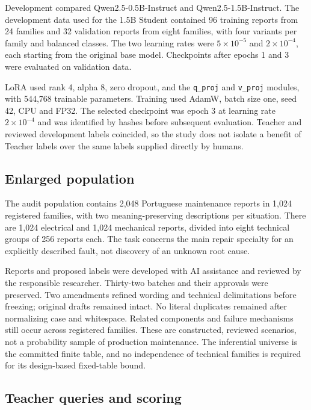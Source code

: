 \documentclass[
  10pt,
]{article}
\begin{document}
Development compared Qwen2.5-0.5B-Instruct and Qwen2.5-1.5B-Instruct.
The development data used for the 1.5B Student contained 96 training
reports from 24 families and 32 validation reports from eight families,
with four variants per family and balanced classes. The two learning
rates were \(5\times10^{-5}\) and \(2\times10^{-4}\), each starting from
the original base model. Checkpoints after epochs 1 and 3 were evaluated
on validation data.

LoRA used rank 4, alpha 8, zero dropout, and the \texttt{q\_proj} and
\texttt{v\_proj} modules, with 544,768 trainable parameters. Training
used AdamW, batch size one, seed 42, CPU and FP32. The selected
checkpoint was epoch 3 at learning rate \(2\times10^{-4}\) and was
identified by hashes before subsequent evaluation. Teacher and reviewed
development labels coincided, so the study does not isolate a benefit of
Teacher labels over the same labels supplied directly by humans.

\hypertarget{enlarged-population}{%
\subsection{Enlarged population}\label{enlarged-population}}

The audit population contains 2,048 Portuguese maintenance reports in
1,024 registered families, with two meaning-preserving descriptions per
situation. There are 1,024 electrical and 1,024 mechanical reports,
divided into eight technical groups of 256 reports each. The task
concerns the main repair specialty for an explicitly described fault,
not discovery of an unknown root cause.

Reports and proposed labels were developed with AI assistance and
reviewed by the responsible researcher. Thirty-two batches and their
approvals were preserved. Two amendments refined wording and technical
delimitations before freezing; original drafts remained intact. No
literal duplicates remained after normalizing case and whitespace.
Related components and failure mechanisms still occur across registered
families. These are constructed, reviewed scenarios, not a probability
sample of production maintenance. The inferential universe is the
committed finite table, and no independence of technical families is
required for its design-based fixed-table bound.

\hypertarget{teacher-queries-and-scoring}{%
\subsection{Teacher queries and
scoring}\label{teacher-queries-and-scoring}}
\end{document}
